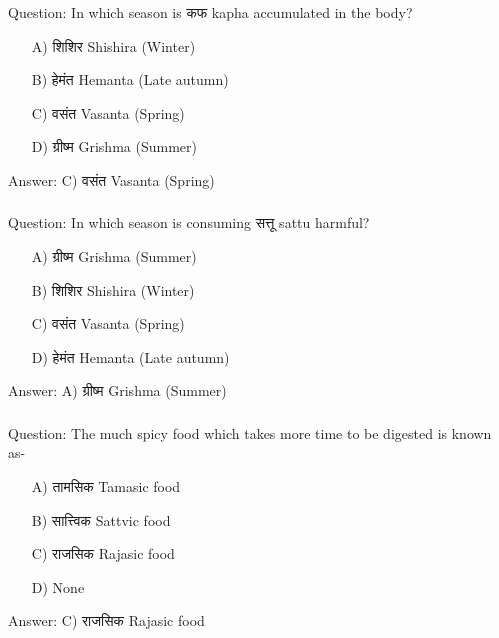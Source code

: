 \begin{frame}[fragile]\frametitle{}

Question: In which season is कफ kapha accumulated in the body?

\begin{itemize}
\item[A)] शिशिर Shishira (Winter)
\item[B)] हेमंत Hemanta (Late autumn)
\item[C)] वसंत Vasanta (Spring)
\item[D)] ग्रीष्म Grishma (Summer)
\end{itemize}

Answer: C) वसंत Vasanta (Spring)
\end{frame}

\begin{frame}[fragile]\frametitle{}

Question: In which season is consuming सत्तू sattu harmful?

\begin{itemize}
\item[A)] ग्रीष्म Grishma (Summer)
\item[B)] शिशिर Shishira (Winter)
\item[C)] वसंत Vasanta (Spring)
\item[D)] हेमंत Hemanta (Late autumn)
\end{itemize}

Answer: A) ग्रीष्म Grishma (Summer)
\end{frame}

\begin{frame}[fragile]\frametitle{}

Question: The much spicy food which takes more time to be digested is known as-

\begin{itemize}
\item[A)] तामसिक Tamasic food
\item[B)] सात्त्विक Sattvic food
\item[C)] राजसिक Rajasic food
\item[D)] None
\end{itemize}

Answer: C) राजसिक Rajasic food
\end{frame}

